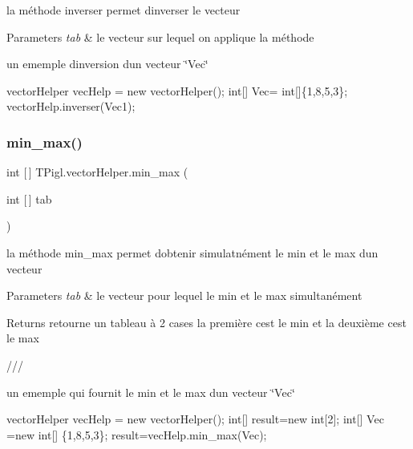 la méthode inverser permet d\textquotesingle{}inverser le vecteur 


\begin{DoxyParams}{Parameters}
{\em tab} & le vecteur sur lequel on applique la méthode \\
\hline
\end{DoxyParams}


un ememple d\textquotesingle{}inversion d\textquotesingle{}un vecteur \char`\"{}\+Vec\char`\"{} 
\begin{DoxyCode}
vectorHelper vecHelp = \textcolor{keyword}{new} vectorHelper();
  \textcolor{keywordtype}{int}[] Vec= \textcolor{keywordtype}{int}[]\{1,8,5,3\}; 
  vectorHelp.inverser(Vec1);
\end{DoxyCode}
 \mbox{\label{class_t_pigl_1_1vector_helper_a615ac23a44fc7c65f2637daba225bfef}} 
\subsubsection{\texorpdfstring{min\+\_\+max()}{min\_max()}}
{\footnotesize\ttfamily int \mbox{[}$\,$\mbox{]} T\+Pigl.\+vector\+Helper.\+min\+\_\+max (\begin{DoxyParamCaption}\item[{int \mbox{[}$\,$\mbox{]}}]{tab }\end{DoxyParamCaption})}



la méthode min\+\_\+max permet d\textquotesingle{}obtenir simulatnément le min et le max d\textquotesingle{}un vecteur 


\begin{DoxyParams}{Parameters}
{\em tab} & le vecteur pour lequel le min et le max simultanément\\
\hline
\end{DoxyParams}
\begin{DoxyReturn}{Returns}
retourne un tableau à 2 cases la première c\textquotesingle{}est le min et la deuxième c\textquotesingle{}est le max
\end{DoxyReturn}
/// 

un ememple qui fournit le min et le max d\textquotesingle{}un vecteur \char`\"{}\+Vec\char`\"{} 
\begin{DoxyCode}
vectorHelper vecHelp = \textcolor{keyword}{new} vectorHelper();
\textcolor{keywordtype}{int}[] result=\textcolor{keyword}{new} \textcolor{keywordtype}{int}[2];
  \textcolor{keywordtype}{int}[] Vec =\textcolor{keyword}{new} \textcolor{keywordtype}{int}[] \{1,8,5,3\};
  result=vecHelp.min\_max(Vec);
\end{DoxyCode}
 \mbox{\label{class_t_pigl_1_1vector_helper_aef84f14c086e1aae4f9446309ba0a1b8}} 
